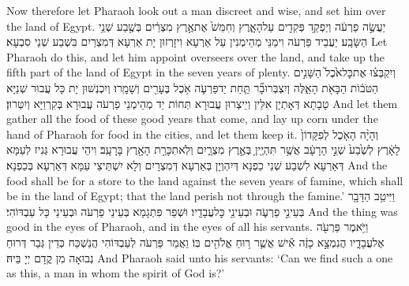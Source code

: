 {Now therefore let Pharaoh look out a man discreet and wise, and set him over the land of Egypt.}{}
{יַעֲשֶׂ֣ה פַרְעֹ֔ה וְיַפְקֵ֥ד פְּקִדִ֖ים עַל\maqqaf הָאָ֑רֶץ וְחִמֵּשׁ֙ אֶת\maqqaf אֶ֣רֶץ מִצְרַ֔יִם בְּשֶׁ֖בַע שְׁנֵ֥י הַשָּׂבָֽע׃}
{יַעֲבֵיד פַּרְעֹה וִימַנֵּי מְהֵימְנִין עַל אַרְעָא וִיזָרְזוּן יָת אַרְעָא דְּמִצְרַיִם בִּשְׁבַע שְׁנֵי סִבְעָא׃}
{Let Pharaoh do this, and let him appoint overseers over the land, and take up the fifth part of the land of Egypt in the seven years of plenty.}{}
{וְיִקְבְּצ֗וּ אֶת\maqqaf כׇּל\maqqaf אֹ֙כֶל֙ הַשָּׁנִ֣ים הַטֹּב֔וֹת הַבָּאֹ֖ת הָאֵ֑לֶּה וְיִצְבְּרוּ\maqqaf בָ֞ר תַּ֧חַת יַד\maqqaf פַּרְעֹ֛ה אֹ֥כֶל בֶּעָרִ֖ים וְשָׁמָֽרוּ׃}
{וְיִכְנְשׁוּן יָת כָּל עֲבוּר שְׁנַיָּא טָבָתָא דְּאָתְיָן אִלֵּין וְיֵיצְרוּן עֲבוּרָא תְּחוֹת יַד מְהֵימְנֵי פַרְעֹה עֲבוּרָא בְּקִרְוַיָּא וְיִטְּרוּן׃}
{And let them gather all the food of these good years that come, and lay up corn under the hand of Pharaoh for food in the cities, and let them keep it.}{}
{וְהָיָ֨ה הָאֹ֤כֶל לְפִקָּדוֹן֙ לָאָ֔רֶץ לְשֶׁ֙בַע֙ שְׁנֵ֣י הָרָעָ֔ב אֲשֶׁ֥ר תִּהְיֶ֖יןָ בְּאֶ֣רֶץ מִצְרָ֑יִם וְלֹֽא\maqqaf תִכָּרֵ֥ת הָאָ֖רֶץ בָּרָעָֽב׃}
{וִיהֵי עֲבוּרָא גְּנִיז לְעַמָּא דְּאַרְעָא לִשְׁבַע שְׁנֵי כַפְנָא דְּיִהְוְיָן בְּאַרְעָא דְּמִצְרָיִם וְלָא יִשְׁתֵּיצֵי עַמָּא דְּאַרְעָא בְּכַפְנָא׃}
{And the food shall be for a store to the land against the seven years of famine, which shall be in the land of Egypt; that the land perish not through the famine.’}{}
{וַיִּיטַ֥ב הַדָּבָ֖ר בְּעֵינֵ֣י פַרְעֹ֑ה וּבְעֵינֵ֖י כׇּל\maqqaf עֲבָדָֽיו׃}
{וּשְׁפַר פִּתְגָמָא בְּעֵינֵי פַרְעֹה וּבְעֵינֵי כָּל עַבְדּוֹהִי׃}
{And the thing was good in the eyes of Pharaoh, and in the eyes of all his servants.}{}
{וַיֹּ֥אמֶר פַּרְעֹ֖ה אֶל\maqqaf עֲבָדָ֑יו הֲנִמְצָ֣א כָזֶ֔ה אִ֕ישׁ אֲשֶׁ֛ר ר֥וּחַ אֱלֹהִ֖ים בּֽוֹ׃}
{וַאֲמַר פַּרְעֹה לְעַבְדּוֹהִי הֲנַשְׁכַּח כְּדֵין גְּבַר דְּרוּחַ נְבוּאָה מִן קֳדָם יְיָ בֵּיהּ׃}
{And Pharaoh said unto his servants: ‘Can we find such a one as this, a man in whom the spirit of God is?’}{}
